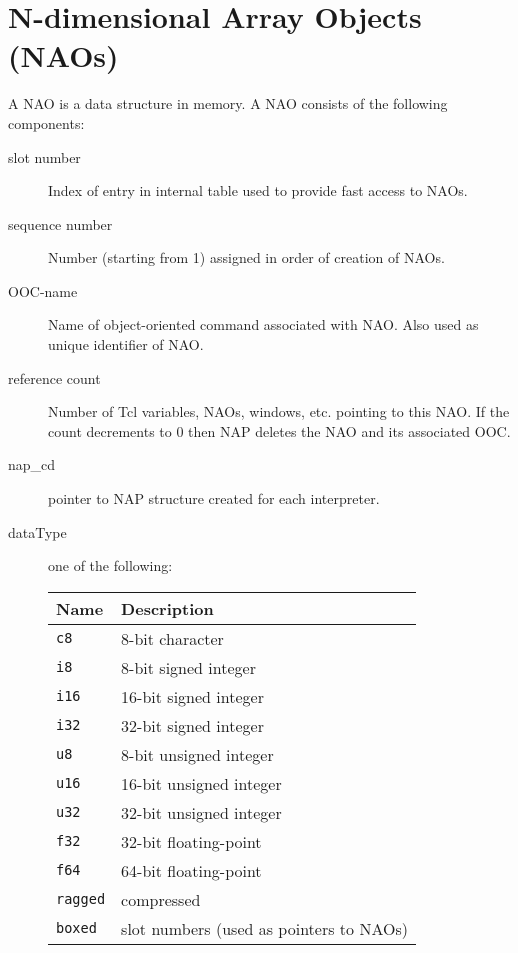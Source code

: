     \section{N-dimensional Array Objects (NAOs)}

  A NAO is a data structure in memory. A NAO consists of the
  following components:
  \begin{description}
    \item[slot number]
    Index of entry in internal table used to provide fast access to
    NAOs.
    \item[sequence number]
    Number (starting from 1) assigned in order of creation of
    NAOs.
    \item[OOC-name]
    Name of object-oriented command associated with NAO. Also used
    as unique identifier of NAO.
    \item[reference count]
    Number of Tcl variables, NAOs, windows, etc. pointing to this
    NAO. If the count decrements to 0 then NAP deletes the NAO and its
    associated OOC.
    \item[nap\_cd]
    pointer to NAP structure created for each interpreter.
    \item[dataType]
    one of the following:

\begin{tabular}{|l|l|}
      \hline 
        \textbf{Name} & \textbf{Description}
      \\
      \hline 
          \texttt{c8} & 8-bit character
      \\
      \hline 
          \texttt{i8} & 8-bit signed integer
      \\
      \hline 
          \texttt{i16} & 16-bit signed integer
      \\
      \hline 
          \texttt{i32} & 32-bit signed integer
      \\
      \hline 
          \texttt{u8} & 8-bit unsigned integer
      \\
      \hline 
          \texttt{u16} & 16-bit unsigned integer
      \\
      \hline 
          \texttt{u32} & 32-bit unsigned integer
      \\
      \hline 
          \texttt{f32} & 32-bit floating-point
      \\
      \hline 
          \texttt{f64} & 64-bit floating-point
      \\
      \hline 
          \texttt{ragged} & compressed
      \\
      \hline 
          \texttt{boxed} & slot numbers (used as pointers to NAOs)
      \\
    \hline
\end{tabular}


\end{description}
